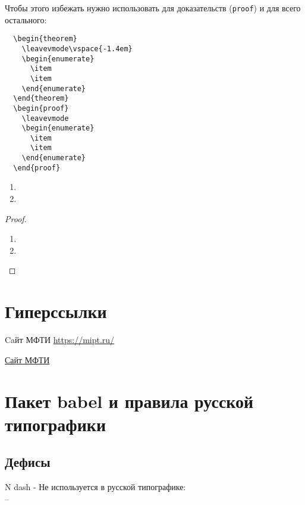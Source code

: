 Чтобы этого избежать нужно использовать \texttt{\leavevmode} для доказательств (\texttt{proof}) и \texttt{\leavevmode\vspace{-1.4em}} для всего остального:
\begin{verbatim}
  \begin{theorem}
    \leavevmode\vspace{-1.4em}
    \begin{enumerate}
      \item
      \item
    \end{enumerate}
  \end{theorem}
  \begin{proof}
    \leavevmode
    \begin{enumerate}
      \item
      \item
    \end{enumerate}
  \end{proof}
\end{verbatim}
\begin{theorem}
  \leavevmode\vspace{-1.4em}
  \begin{enumerate}
    \item
    \item
  \end{enumerate}
\end{theorem}
\begin{proof}
  \leavevmode
  \begin{enumerate}
    \item
    \item
  \end{enumerate}
\end{proof}

\section{Гиперссылки}

Caйт МФТИ \url{https://mipt.ru/}

\href{https://mipt.ru/}{Сайт МФТИ}

\section{Пакет babel и правила русской типографики}
\subsection{Дефисы}
N dash - Не используется в русской типографике:\\
--

